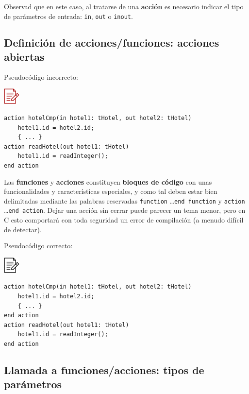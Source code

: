 \documentclass[
]{book}
\begin{document}
Observad que en este caso, al tratarse de una \textbf{acción} es necesario indicar el tipo de parámetros de entrada: \texttt{in}, \texttt{out} o \texttt{inout}.

\hypertarget{definiciuxf3n-de-accionesfunciones-acciones-abiertas}{%
\subsection{Definición de acciones/funciones: acciones abiertas}\label{definiciuxf3n-de-accionesfunciones-acciones-abiertas}}

Pseudocódigo incorrecto:

\includegraphics{./img/alg_err.png}

\begin{verbatim}
action hotelCmp(in hotel1: tHotel, out hotel2: tHotel)
    hotel1.id = hotel2.id;
    { ... }
action readHotel(out hotel1: tHotel)
    hotel1.id = readInteger();
end action
\end{verbatim}

Las \textbf{funciones} y \textbf{acciones} constituyen \textbf{bloques de código} con unas funcionalidades y características especiales, y como tal deben estar bien delimitadas mediante las palabras reservadas \texttt{function} \ldots{}\texttt{end\ function} y \texttt{action} \ldots{}\texttt{end\ action}. Dejar una acción sin cerrar puede parecer un tema menor, pero en C esto comportará con toda seguridad un error de compilación (a menudo difícil de detectar).

Pseudocódigo correcto:

\includegraphics{./img/alg.png}

\begin{verbatim}
action hotelCmp(in hotel1: tHotel, out hotel2: tHotel)
    hotel1.id = hotel2.id;
    { ... }
end action
action readHotel(out hotel1: tHotel)
    hotel1.id = readInteger();
end action
\end{verbatim}

\hypertarget{llamada-a-funcionesacciones-tipos-de-paruxe1metros}{%
\subsection{Llamada a funciones/acciones: tipos de parámetros}\label{llamada-a-funcionesacciones-tipos-de-paruxe1metros}}
\end{document}
